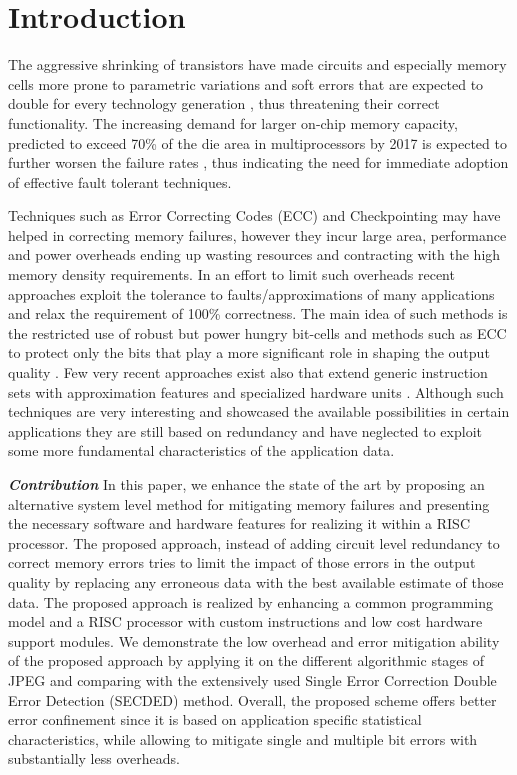 \section{Introduction} \label{sec:introduction}
The aggressive shrinking of transistors have made circuits and especially memory cells more prone to parametric variations 
and soft errors that are expected to double for every technology generation \cite{borkar2010exascale}, thus threatening their correct functionality. The increasing demand for larger on-chip memory capacity, predicted to exceed 70\% of the die area in multiprocessors by 2017 is expected to further worsen the failure rates \cite{semiconductor2004soft}, thus indicating the need for immediate adoption of effective fault tolerant techniques.  

Techniques such as Error Correcting Codes (ECC) \cite{EmreC13} and Checkpointing \cite{dong2009leveraging} may have helped in correcting memory failures, however they incur large area, performance and power overheads ending up wasting resources and contracting with the high memory density requirements. In an effort to limit such overheads recent approaches exploit the tolerance to faults/approximations of many applications  \cite{chippa2013analysis} and relax the requirement of 100\% correctness. The main idea of such methods
is the restricted use of robust but power hungry bit-cells and methods such as ECC to protect only the bits that play a more significant role in shaping the output quality \cite{YuehCM13} \cite{LeeKPP13}. Few very recent approaches exist also that extend generic instruction sets with approximation features and specialized hardware units \cite{esmaeilzadeh2012architecture}\cite{venkataramani2013quality}\cite{sampson2011enerj}. Although such techniques are very interesting and showcased the available possibilities in certain applications they are still based on redundancy and have neglected to exploit some more fundamental characteristics of the application data.    
    
\textbf{\textit{Contribution}} In this paper, we enhance the state of the art by proposing an alternative system level method for mitigating memory failures and presenting the necessary software and hardware features for realizing it within a RISC processor. 
The proposed approach, instead of adding circuit level redundancy to correct memory errors tries to limit the impact of those errors in the output quality by replacing any erroneous data with the best available estimate of those data. The proposed approach is realized by enhancing a common programming model and a RISC processor with custom instructions and low cost hardware support modules. We demonstrate the low overhead and error mitigation ability of  the proposed approach by applying it on the different algorithmic stages of JPEG and comparing with the extensively used Single Error Correction Double Error Detection (SECDED) method. Overall, the proposed scheme offers better error confinement since it is based on application specific statistical characteristics, while allowing to mitigate single and multiple bit errors with substantially less overheads.  

